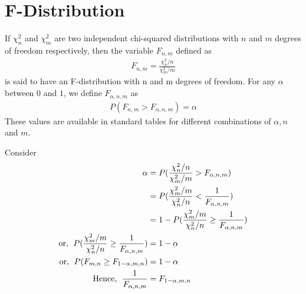 \documentclass[../probability-notes.tex]{subfiles}
\begin{document}
    \section{F-Distribution}
    If $\chi_{n}^{2}$ and $\chi_{m}^{2}$ are two independent chi-squared distributions with $n$ and $m$ degrees of freedom respectively, then the variable $F_{n,m}$ defined as
    \begin{align*}
        F_{n,m} = \frac{\chi_{n}^{2}/n}{\chi_{m}^{2}/m}
    \end{align*}
    is said to have an F-distribution with n and m degrees of freedom.\newline
    For any $\alpha$ between $0$ and $1$, we define $F_{\alpha, n, m}$ as 
    \begin{align*}
        P(F_{n,m} > F_{\alpha, n, m}) = \alpha
    \end{align*}
    These values are available in standard tables for different combinations of $\alpha, n$ and $m$.\newline

    Consider
    \begin{align*}
        \alpha &= P(\frac{\chi_{n}^{2}/n}{\chi_{m}^{2}/m} > F_{\alpha, n, m})\\
        &= P(\frac{\chi_{m}^{2}/m}{\chi_{n}^{2}/n} < \frac{1}{F_{\alpha, n, m}})\\
        &= 1 - P(\frac{\chi_{m}^{2}/m}{\chi_{n}^{2}/n} \geq \frac{1}{F_{\alpha, n, m}})\\
        \text{or, \;} P(\frac{\chi_{m}^{2}/m}{\chi_{n}^{2}/n} \geq \frac{1}{F_{\alpha, n, m}}) &= 1 - \alpha\\
        \text{or, \;} P(F_{m,n} \geq F_{1 - \alpha, m, n}) &= 1 - \alpha\\
        \text{Hence, \;} \frac{1}{F_{\alpha, n, m}} &= F_{1-\alpha, m, n}
    \end{align*}
\end{document}
